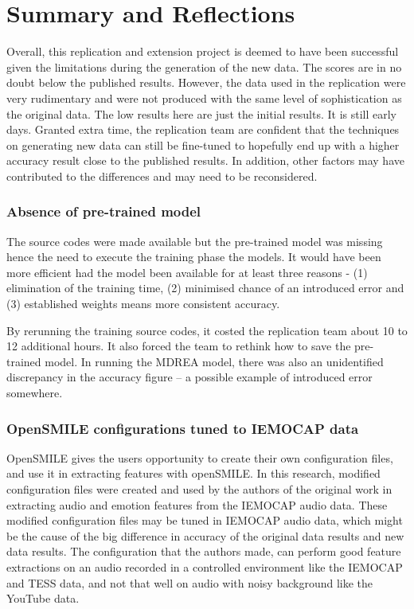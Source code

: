 \documentclass{article}
\begin{document}
\section{Summary and Reflections}
    Overall, this replication and extension project is deemed to have been successful given the limitations during the generation of the new data. The scores are in no doubt below the published results. However, the data used in the replication were very rudimentary and were not produced with the same level of sophistication as the original data. The low results here are just the initial results. It is still early days. Granted extra time, the replication team are confident that the techniques on generating new data can still be fine-tuned to hopefully end up with a higher accuracy result close to the published results. In addition, other factors may have contributed to the differences and may need to be reconsidered.
    
    \subsubsection*{Absence of pre-trained model}
        The source codes were made available but the pre-trained model was missing hence the need to execute the training phase the models.  It would have been more efficient had the model been available for at least three reasons - (1) elimination of the training time, (2) minimised chance of an introduced error and (3) established weights means more consistent accuracy.\par
    
        By rerunning the training source codes, it costed the replication team about 10 to 12 additional hours. It also forced the team to rethink how to save the pre-trained model. In running the MDREA model, there was also an unidentified discrepancy in the accuracy figure – a possible example of introduced error somewhere.\par
    
    \subsubsection*{OpenSMILE configurations tuned to IEMOCAP data}
        OpenSMILE gives the users opportunity to create their own configuration files, and use it in extracting features with openSMILE. In this research, modified configuration files were created and used by the authors of the original work in extracting audio and emotion features from the IEMOCAP audio data. These modified configuration files may be tuned in IEMOCAP audio data, which might be the cause of the big difference in accuracy of the original data results and new data results. The configuration that the authors made, can perform good feature extractions on an audio recorded in a controlled environment like the IEMOCAP and TESS data, and not that well on audio with noisy background like the YouTube data.\par
    
\end{document}
